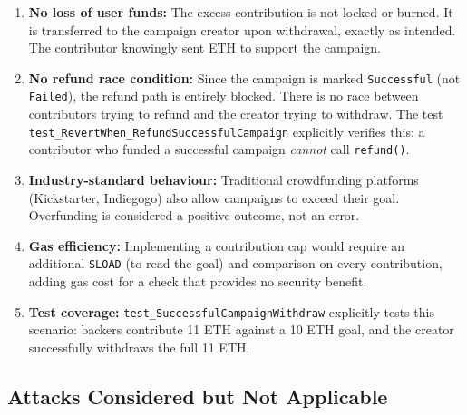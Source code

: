 \begin{enumerate}[leftmargin=1.5em]
    \item \textbf{No loss of user funds:} The excess contribution is not locked or burned. It is transferred to the campaign creator upon withdrawal, exactly as intended. The contributor knowingly sent ETH to support the campaign.
    
    \item \textbf{No refund race condition:} Since the campaign is marked \texttt{Successful} (not \texttt{Failed}), the refund path is entirely blocked. There is no race between contributors trying to refund and the creator trying to withdraw. The test \texttt{test\_RevertWhen\_RefundSuccessfulCampaign} explicitly verifies this: a contributor who funded a successful campaign \emph{cannot} call \texttt{refund()}.
    
    \item \textbf{Industry-standard behaviour:} Traditional crowdfunding platforms (Kickstarter, Indiegogo) also allow campaigns to exceed their goal. Overfunding is considered a positive outcome, not an error.
    
    \item \textbf{Gas efficiency:} Implementing a contribution cap would require an additional \texttt{SLOAD} (to read the goal) and comparison on every contribution, adding gas cost for a check that provides no security benefit.
    
    \item \textbf{Test coverage:} \texttt{test\_SuccessfulCampaignWithdraw} explicitly tests this scenario: backers contribute 11 ETH against a 10 ETH goal, and the creator successfully withdraws the full 11 ETH.
\end{enumerate}

\subsection{Attacks Considered but Not Applicable}

